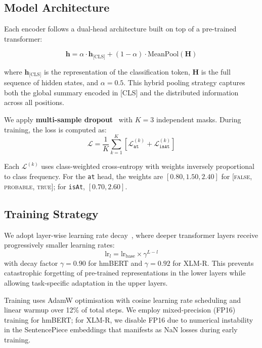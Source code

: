 \documentclass[runningheads]{llncs}
\begin{document}
\subsection{Model Architecture}

Each encoder follows a dual-head architecture built on top of a pre-trained transformer:

\begin{equation}
    \mathbf{h} = \alpha \cdot \mathbf{h}_{\text{[CLS]}} + (1-\alpha) \cdot \text{MeanPool}(\mathbf{H})
\end{equation}

where $\mathbf{h}_{\text{[CLS]}}$ is the representation of the classification token, $\mathbf{H}$ is the full sequence of hidden states, and $\alpha=0.5$. This hybrid pooling strategy captures both the global summary encoded in [CLS] and the distributed information across all positions.

We apply \textbf{multi-sample dropout}~\cite{inoue2019} with $K=3$ independent masks. During training, the loss is computed as:
\begin{equation}
    \mathcal{L} = \frac{1}{K}\sum_{k=1}^{K}\left[\mathcal{L}_{\texttt{at}}^{(k)} + \mathcal{L}_{\texttt{isAt}}^{(k)}\right]
\end{equation}

Each $\mathcal{L}^{(k)}$ uses class-weighted cross-entropy with weights inversely proportional to class frequency. For the \texttt{at} head, the weights are $[0.80, 1.50, 2.40]$ for [\textsc{false}, \textsc{probable}, \textsc{true}]; for \texttt{isAt}, $[0.70, 2.60]$.

\subsection{Training Strategy}

We adopt layer-wise learning rate decay~\cite{howard2018}, where deeper transformer layers receive progressively smaller learning rates:
\begin{equation}
    \text{lr}_l = \text{lr}_{\text{base}} \times \gamma^{L-l}
\end{equation}
with decay factor $\gamma=0.90$ for hmBERT and $\gamma=0.92$ for XLM-R. This prevents catastrophic forgetting of pre-trained representations in the lower layers while allowing task-specific adaptation in the upper layers.

Training uses AdamW optimisation with cosine learning rate scheduling and linear warmup over 12\% of total steps. We employ mixed-precision (FP16) training for hmBERT; for XLM-R, we disable FP16 due to numerical instability in the SentencePiece embeddings that manifests as NaN losses during early training.
\end{document}
